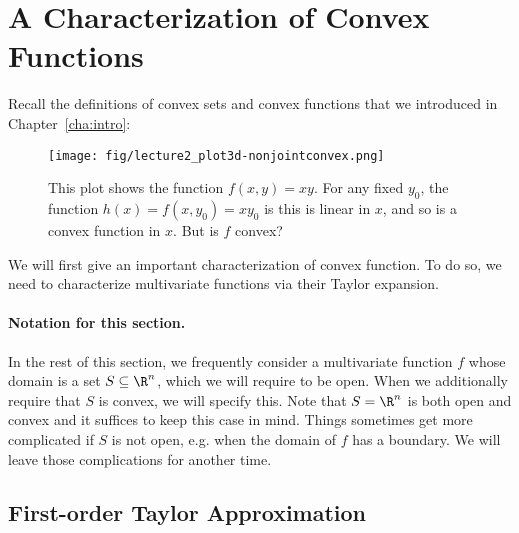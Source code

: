 \section{A Characterization of Convex Functions}
Recall the definitions of convex sets and convex functions that we
introduced in Chapter~\ref{cha:intro}:




\begin{figure}[h]
  \centering
     \texttt{[image: fig/lecture2\_plot3d-nonjointconvex.png]}
\caption{This plot shows the function $f(x,y) = xy$. For any fixed
  $y_0$, the function $h(x) = f(x,y_0) = xy_0$ is
this is linear in $x$, and so is a convex
function in $x$. But is $f$ convex?}
\label{fig:nonjointconvex}
\end{figure}

We will first give an important characterization of convex function.  To do so, we need to characterize multivariate functions via their Taylor expansion.

\paragraph{Notation for this section.}
  In the rest of this section, we frequently consider a multivariate function $f$
  whose domain is a set $S \subseteq \R^n$, which we will require to
  be open.
  When we additionally require that $S$ is convex, we will specify this.
  Note that $S = \R^n$ is both open and convex and it suffices to keep
  this case in mind.
  Things sometimes get more complicated if $S$ is not open, e.g. when the
  domain of $f$ has a boundary.
  We will leave those complications for another time.

\subsection{First-order Taylor Approximation}

